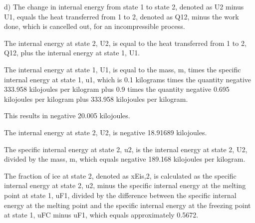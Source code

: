 d) The change in internal energy from state 1 to state 2, denoted as U2 minus U1, equals the heat transferred from 1 to 2, denoted as Q12, minus the work done, which is cancelled out, for an incompressible process.

The internal energy at state 2, U2, is equal to the heat transferred from 1 to 2, Q12, plus the internal energy at state 1, U1.

The internal energy at state 1, U1, is equal to the mass, m, times the specific internal energy at state 1, u1, which is 0.1 kilograms times the quantity negative 333.958 kilojoules per kilogram plus 0.9 times the quantity negative 0.695 kilojoules per kilogram plus 333.958 kilojoules per kilogram.

This results in negative 20.005 kilojoules.

The internal energy at state 2, U2, is negative 18.91689 kilojoules.

The specific internal energy at state 2, u2, is the internal energy at state 2, U2, divided by the mass, m, which equals negative 189.168 kilojoules per kilogram.

The fraction of ice at state 2, denoted as xEis,2, is calculated as the specific internal energy at state 2, u2, minus the specific internal energy at the melting point at state 1, uF1, divided by the difference between the specific internal energy at the melting point and the specific internal energy at the freezing point at state 1, uFC minus uF1, which equals approximately 0.5672.